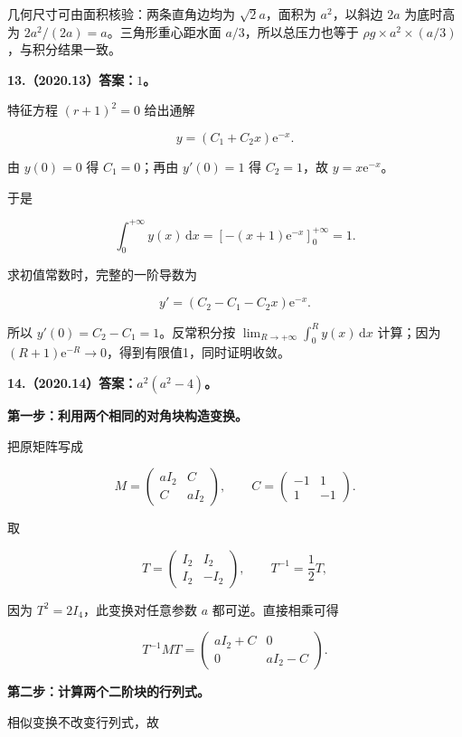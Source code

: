 \documentclass[UTF8,11pt,fontset=windows]{ctexart}
\begin{document}
几何尺寸可由面积核验：两条直角边均为 $\sqrt2a$，面积为 $a^2$，以斜边 $2a$ 为底时高为 $2a^2/(2a)=a$。三角形重心距水面 $a/3$，所以总压力也等于 $\rho g\times a^2\times(a/3)$，与积分结果一致。

\clearpage

\textbf{13.（2020.13）答案：$1$。}

特征方程 $(r+1)^2=0$ 给出通解

$$
y=(C_1+C_2x)\mathrm e^{-x}.
$$

由 $y(0)=0$ 得 $C_1=0$；再由 $y'(0)=1$ 得 $C_2=1$，故 $y=x\mathrm e^{-x}$。

于是

$$
\int_0^{+\infty}y(x)\,\mathrm dx
=\left[-(x+1)\mathrm e^{-x}\right]_0^{+\infty}=1.
$$

求初值常数时，完整的一阶导数为

$$
y'=(C_2-C_1-C_2x)\mathrm e^{-x}.
$$

所以 $y'(0)=C_2-C_1=1$。反常积分按 $\lim_{R\to+\infty}\int_0^R y(x)\,\mathrm dx$ 计算；因为 $(R+1)\mathrm e^{-R}\to0$，得到有限值1，同时证明收敛。

\clearpage

\textbf{14.（2020.14）答案：$a^2(a^2-4)$。}

\textbf{第一步：利用两个相同的对角块构造变换。}

把原矩阵写成

$$
M=\begin{pmatrix}aI_2&C\\C&aI_2\end{pmatrix},
\qquad C=\begin{pmatrix}-1&1\\1&-1\end{pmatrix}.
$$

取

$$
T=\begin{pmatrix}I_2&I_2\\I_2&-I_2\end{pmatrix},
\qquad T^{-1}=\frac12T,
$$

因为 $T^2=2I_4$，此变换对任意参数 $a$ 都可逆。直接相乘可得

$$
T^{-1}MT=
\begin{pmatrix}aI_2+C&0\\0&aI_2-C\end{pmatrix}.
$$

\textbf{第二步：计算两个二阶块的行列式。}

相似变换不改变行列式，故
\end{document}
